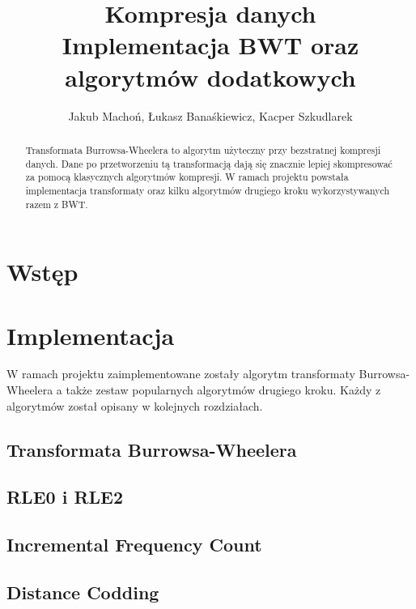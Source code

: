 \documentclass[a4paper,12pt]{article}
\begin{document}
\title{{\small Kompresja danych}\\Implementacja BWT oraz algorytmów dodatkowych}
\author{Jakub Machoń, Łukasz Banaśkiewicz, Kacper Szkudlarek}

\maketitle

\begin{abstract}
Transformata Burrowsa-Wheelera to algorytm użyteczny przy bezstratnej kompresji danych. Dane po przetworzeniu tą transformacją dają się znacznie lepiej skompresować za pomocą klasycznych algorytmów kompresji. W ramach projektu powstała implementacja transformaty oraz kilku algorytmów drugiego kroku wykorzystywanych razem z BWT.
\end{abstract}


\section{Wstęp}


\section{Implementacja}

W ramach projektu zaimplementowane zostały algorytm transformaty Burrowsa-Wheelera a także zestaw popularnych algorytmów drugiego kroku. Każdy z algorytmów został opisany w kolejnych rozdziałach.

\subsection{Transformata Burrowsa-Wheelera}
\label{ch:BWT}


\subsection{RLE0 i RLE2}
\label{ch:rle}


\subsection{Incremental Frequency Count}
\label{ch:ifc}


\subsection{Distance Codding}
\label{ch:dc}

\end{document}
